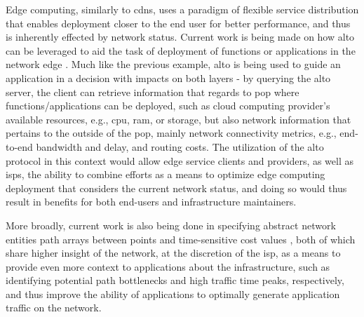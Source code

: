     Edge computing, similarly to \glspl{cdn}, uses a paradigm of flexible service distribution that enables deployment closer to the end user for better performance, and thus is inherently effected by network status.
    Current work is being made on how \gls{alto} can be leveraged to aid the task of deployment of functions or applications in the network edge \cite{alto-determining-service-edge}.
    Much like the previous example, \gls{alto} is being used to guide an application in a decision with impacts on both layers - by querying the \gls{alto} server, the client can retrieve information that regards to \gls{pop} where functions/applications can be deployed, such as cloud computing provider's available resources, e.g., \gls{cpu}, \gls{ram}, or storage, but also network information that pertains to the outside of the \gls{pop}, mainly network connectivity metrics, e.g., end-to-end bandwidth and delay, and routing costs.
    The utilization of the \gls{alto} protocol in this context would allow edge service clients and providers, as well as \glspl{isp}, the ability to combine efforts as a means to optimize edge computing deployment that considers the current network status, and doing so would thus result in benefits for both end-users and infrastructure maintainers.

        More broadly, current work is also being done in specifying abstract network entities path arrays between points \cite{alto-path-vector} and time-sensitive cost values \cite{alto-calendar-cost-map}, both of which share higher insight of the network, at the discretion of the \gls{isp}, as a means to provide even more context to applications about the infrastructure, such as identifying potential path bottlenecks and high traffic time peaks, respectively, and thus improve the ability of applications to optimally generate application traffic on the network.

